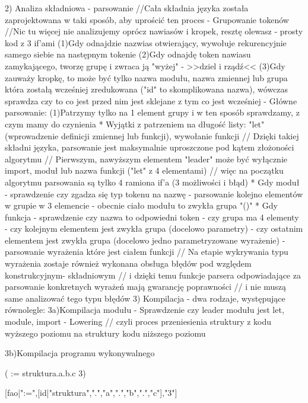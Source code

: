 2) Analiza składniowa - parsowanie
//Cała składnia języka została zaprojektowana w taki sposób, aby uprościć ten proces
 - Grupowanie tokenów //Nic tu więcej nie analizujemy oprócz nawiasów i kropek, resztę olewasz - prosty kod z 3 if'ami
   (1)Gdy odnajdzie nazwias otwierający, wywołuje rekurencyjnie samego siebie na następnym tokenie 
   (2)Gdy odnajdę token nawiasu zamykającego, tworzę grupę i zwraca ją "wyżej" - >>dziel i rządź<< 
   (3)Gdy zauważy kropkę, to może być tylko nazwa modułu, nazwa zmiennej lub grupa która zostałą wcześniej zredukowana ("id" to skomplikowana nazwa), wówczas sprawdza czy to co jest przed nim jest sklejane z tym co jest wcześniej
 - Główne parsowanie:
   (1)Patrzymy tylko na 1 element grupy i w ten sposób sprawdzamy, z czym mamy do czynienia
     * Wyjątki z patrzeniem na długość listy: "let" (wprowadzenie definicji zmiennej lub funkcji), wywołanie funkcji
   // Dzięki takiej składni języka, parsowanie jest maksymalnie uproszczone pod kątem złożoności algorytmu
   // Pierwszym, nawyższym elementem "leader" może być wyłącznie import, moduł lub nazwa funkcji ("let" z 4 elementami)
   // więc na początku algorytmu parsowania są tylko 4 ramiona if'a (3 możliwości i błąd)
     * Gdy moduł - sprawdzenie czy zgadza się typ tokenu na nazwę
                 - parsowanie kolejno elementów w grupie w 3 elemencie
                 - obecnie ciało modułu to zwykła grupa "()"
     * Gdy funkcja - sprawdzenie czy nazwa to odpowiedni token
                   - czy grupa ma 4 elementy
                   - czy kolejnym elementem jest zwykła grupa (docelowo parametry)
                   - czy ostatnim elementem jest zwykła grupa (docelowo jedno parametryzowane wyrażenie)
                   - parsowanie wyrażenia które jest ciałem funkcji
   // Na etapie wykrywania typu wyrażenia zostaje również wykonana obsługa błędów pod względem konstrukcyjnym- składniowym
   // i dzięki temu funkcje parsera odpowiadające za parsowanie konkretnych wyrażeń mają gwarancję poprawności
   // i nie muszą same analizować tego typu błędów
3) Kompilacja - dwa rodzaje, występujące równolegle:
3a)Kompilacja modułu
 - Sprawdzenie czy leader modułu jest let, module, import
 - Lowering // czyli proces przeniesienia struktury z kodu wyższego poziomu na struktury kodu niższego poziomu
 
3b)Kompilacja programu wykonywalnego 
 
( := struktura.a.b.c 3)

[fao|":=",[id|"struktura",".","a",".","b",".","c"],"3"]



